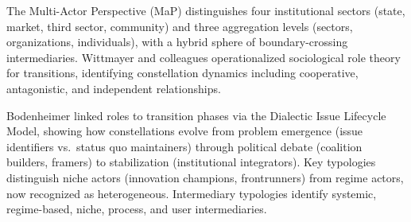 \documentclass[../main.tex]{subfiles}
\begin{document}
The Multi-Actor Perspective (MaP) distinguishes four institutional sectors (state, market, third sector, community) and three aggregation levels (sectors, organizations, individuals), with a hybrid sphere of boundary-crossing intermediaries. Wittmayer and colleagues operationalized sociological role theory for transitions, identifying constellation dynamics including cooperative, antagonistic, and independent relationships.

Bodenheimer linked roles to transition phases via the Dialectic Issue Lifecycle Model, showing how constellations evolve from problem emergence (issue identifiers vs.\ status quo maintainers) through political debate (coalition builders, framers) to stabilization (institutional integrators). Key typologies distinguish niche actors (innovation champions, frontrunners) from regime actors, now recognized as heterogeneous. Intermediary typologies identify systemic, regime-based, niche, process, and user intermediaries.

\begin{center}
\label{fig:map-sectors}
\end{center}
\end{document}
